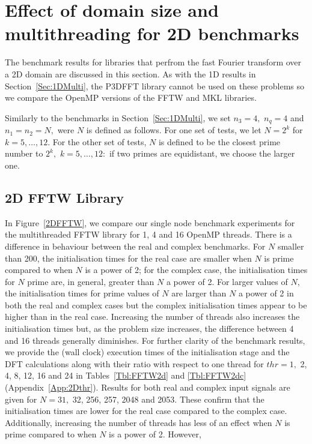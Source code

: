\documentclass[a4paper]{article}
\begin{document}
\section{Effect of domain size and multithreading for 2D benchmarks}\label{Sec:2DMulti}
The benchmark results for libraries that perfrom the fast Fourier
transform over a 2D domain are discussed in this section. As with the
1D results in Section~\ref{Sec:1DMulti}, the P3DFFT library cannot be
used on these problems so we compare the OpenMP versions of the FFTW
and MKL libraries.

Similarly to the benchmarks in Section~\ref{Sec:1DMulti}, we set
$n_3=4,$ $n_q=4$ and $n_1=n_2=N,$ were $N$ is defined as follows.  For one
set of tests, we let $N=2^k$ for $k=5,\ldots,12.$ For the other set of
tests, $N$ is defined to be the closest prime number to $2^k,$
$k=5,\ldots,12:$ if two primes are equidistant, we choose the larger
one.

\subsection{2D FFTW Library}\label{Sec:2DFFTW}

In Figure~\ref{2DFFTW}, we compare our single node benchmark
experiments for the multithreaded FFTW library for 1, 4 and 16 OpenMP
threads. There is a difference in behaviour between the real and
complex benchmarks. For $N$ smaller than 200, the initialisation times
for the real case are smaller when $N$ is prime compared to when $N$
is a power of 2; for the complex case, the initialisation times for
$N$ prime are, in general, greater than $N$ a power of 2. For larger
values of $N,$ the initialisation times for prime values of $N$ are
larger than $N$ a power of 2 in both the real and complex cases but
the complex initialisation times appear to be higher than in the real
case. Increasing the number of threads also increases the
initialisation times but, as the problem size increases, the
difference between 4 and 16 threads generally diminishes. For further
clarity of the benchmark results, we provide the (wall clock)
execution times of the initialisation stage and the DFT calculations
along with their ratio with respect to one thread for $thr=1,$ 2, 4,
8, 12, 16 and 24 in Tables~\ref{Tbl:FFTW2d} and
\ref{Tbl:FFTW2dc} (Appendix~\ref{App:2Dthr}). Results for both real and complex input signals are
given for $N=31,$ 32, 256, 257, 2048 and 2053. These confirm that the
initialisation times are lower for the real case compared to the
complex case. Additionally, increasing the number of threads has less
of an effect when $N$ is prime compared to when $N$ is a power of
2. However,
\end{document}
